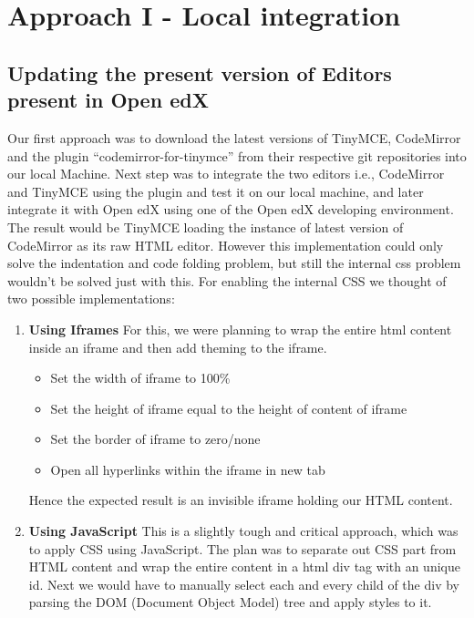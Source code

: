 
\chapter{Approach I - Local integration}
\section{Updating the present version of Editors present in Open edX}
Our first approach was to download the latest versions of TinyMCE, CodeMirror and
the plugin “codemirror-for-tinymce” from their respective git repositories into our local
Machine.\newline
Next step was to integrate the two editors i.e., CodeMirror and TinyMCE using the plugin and
test it on our local machine, and later integrate it with Open edX using one of the Open edX developing
environment.\newline
The result would be TinyMCE loading the instance of latest version of CodeMirror as its
raw HTML editor.
However this implementation could only solve the indentation and code folding problem,
but still the internal css problem wouldn’t be solved just with this.\newline\newline
For enabling the internal CSS we thought of two possible implementations:
\begin{enumerate}
\item\textbf{Using Iframes}\newline
For this, we were planning to wrap the entire html content inside an iframe
and then add theming to the iframe.
\begin{itemize}
\item Set the width of iframe to 100\%
\item Set the height of iframe equal to the height of content of iframe
\item Set the border of iframe to zero/none
\item Open all hyperlinks within the iframe in new tab
\end{itemize}
Hence the expected result is an invisible iframe holding our HTML content.



\item\textbf{Using JavaScript}\newline
This is a slightly tough and critical approach, which was to apply CSS using
JavaScript. The plan was to separate out CSS part from HTML content and
wrap the entire content in a html div tag with an unique id.
Next we would have to manually select each and every child of the div by
parsing the DOM (Document Object Model) tree and apply styles to it.\newline
\end{enumerate}

